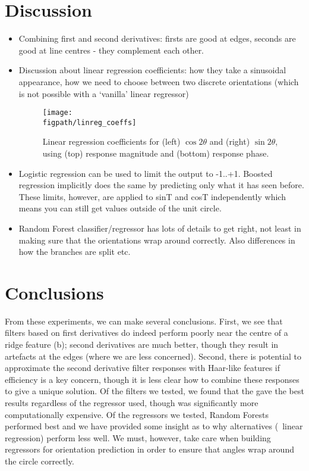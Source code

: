 \section{Discussion}
\label{s:discussion}
\begin{itemize}
\item Combining first and second derivatives: firsts are good at edges, seconds are good at line centres - they complement each other.

\item Discussion about linear regression coefficients: how they take a sinusoidal appearance, how we need to choose between two discrete orientations (which is not possible with a `vanilla' linear regressor)
%
\begin{figure}[t]
	\centering
		\texttt{[image: \\figpath/linreg\_coeffs]}
	\caption{Linear regression coefficients for (left) $\cos 2\theta$ and (right) $\sin 2\theta$, using (top) response magnitude and (bottom) response phase.}
	\label{f:linreg_coeffs}
\end{figure}

\item Logistic regression can be used to limit the output to -1..+1. Boosted regression implicitly does the same by predicting only what it has seen before. These limits, however, are applied to sinT and cosT independently which means you can still get values outside of the unit circle.

\item Random Forest classifier/regressor has lots of details to get right, not least in making sure that the orientations wrap around correctly. Also differences in how the branches are split etc.

\end{itemize}


\section{Conclusions}
\label{s:conclusions}
From these experiments, we can make several conclusions. First, we see that filters based on first derivatives do indeed perform poorly near the centre of a ridge feature (b); second derivatives are much better, though they result in artefacts at the edges (where we are less concerned). Second, there is potential to approximate the second derivative filter responses with Haar-like features if efficiency is a key concern, though it is less clear how to combine these responses to give a unique solution. Of the filters we tested, we found that the \dtcwt{} gave the best results regardless of the regressor used, though was significantly more computationally expensive. Of the regressors we tested, Random Forests performed best and we have provided some insight as to why alternatives (\eg~linear regression) perform less well. We must, however, take care when building regressors for orientation prediction in order to ensure that angles wrap around the circle correctly.

